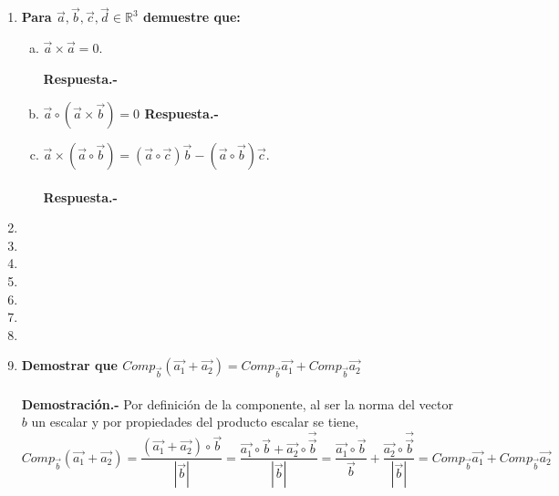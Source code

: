 \begin{enumerate}
\item \textbf{Para \boldmath $\vec{a},\vec{b},\vec{c},\vec{d}\in \mathbb{R}^3$ demuestre que:}

	\begin{enumerate}[a)]

	    \item \textbf{\boldmath $\vec{a}\times \vec{a}=0.$\\\\
		Respuesta.-}\;

	    \item \textbf{\boldmath $\vec{a}\circ \left(\vec{a}\times \vec{b}\right)=0$
		Respuesta.-}\;

	    \item \textbf{\boldmath $\vec{a}\times \left(\vec{a}\circ \vec{b}\right)=\left(\vec{a}\circ \vec{c}\right)\vec{b}-\left(\vec{a}\circ \vec{b}\right)\vec{c}.$\\\\
		Respuesta.-}\;
	\end{enumerate}

\item 

\item 

\item 

\item 

\item 

\item 

\item 

\item \textbf{\boldmath Demostrar que $Comp_{\vec{b}}\left(\vec{a_1}+\vec{a_2}\right) = Comp_{\vec{b}}\vec{a_1} + Comp_{\vec{b}}\vec{a_2}$\\\\
    Demostración.-}\; Por definición de la componente, al ser la norma del vector $b$ un escalar y por propiedades del producto escalar se tiene, 
    $$Comp_{\vec{b}}\left(\vec{a_1}+\vec{a_2}\right) = \dfrac{\left(\vec{a_1}+\vec{a_2}\right)\circ \vec{b}}{|\vec{b}|}=\dfrac{\vec{a_1}\circ \vec{b} + \vec{a_2} \circ \vec{\vec{b}}}{|\vec{b}|} = \dfrac{\vec{a_1}\circ \vec{b}}{\vec{b}} + \dfrac{\vec{a_2} \circ \vec{\vec{b}}}{|\vec{b}|} =  Comp_{\vec{b}}\vec{a_1} + Comp_{\vec{b}}\vec{a_2}$$\\


\end{enumerate}
